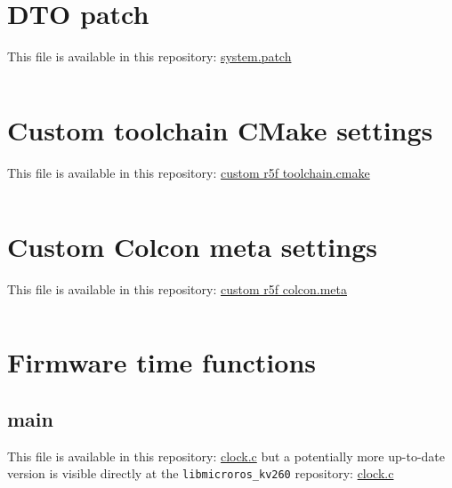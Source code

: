 \documentclass[10pt]{article}
\begin{document}
\pagebreak
\appendix


\section{DTO patch}
\label{sec:org1c69839}
This file is available in this repository: \href{https://gitlab.com/sunoc/xilinx-kria-kv260-documentation/-/blob/b7300116e153f4b5a1542f8804e4646db8030033/src/system.patch}{system.patch}
\inputminted[linenos, frame=single]{diff}{./src/system.patch}

\pagebreak
\section{Custom toolchain CMake settings}
\label{sec:org28dc3ed}
This file is available in this repository: \href{https://gitlab.com/sunoc/xilinx-kria-kv260-documentation/-/blob/b7300116e153f4b5a1542f8804e4646db8030033/src/custom\_r5f\_toolchain.cmake}{custom r5f toolchain.cmake}
\inputminted[linenos, frame=single]{cmake}{./src/custom_r5f_toolchain.cmake}

\pagebreak
\section{Custom Colcon meta settings}
\label{sec:org682385f}
This file is available in this repository: \href{https://gitlab.com/sunoc/xilinx-kria-kv260-documentation/-/blob/b7300116e153f4b5a1542f8804e4646db8030033/src/custom\_r5f\_colcon.meta}{custom r5f colcon.meta}
\inputminted[linenos, frame=single]{yaml}{./src/custom_r5f_colcon.meta}

\pagebreak
\section{Firmware time functions}
\label{sec:orgab34509}

\subsection{main}
\label{sec:org128e4a9}
This file is available in this repository: \href{https://gitlab.com/sunoc/xilinx-kria-kv260-documentation/-/blob/b7300116e153f4b5a1542f8804e4646db8030033/src/clock.c}{clock.c}
but a potentially more up-to-date version is visible
directly at the \texttt{libmicroros\_kv260} repository: \href{https://gitlab.com/sunoc/libmicroros\_kv260/-/blob/4867e762f66af7b4647232eb4c0a31106db66e13/src/clock.c}{clock.c}

\inputminted[linenos, frame=single]{c}{./src/clock.c}
\end{document}
